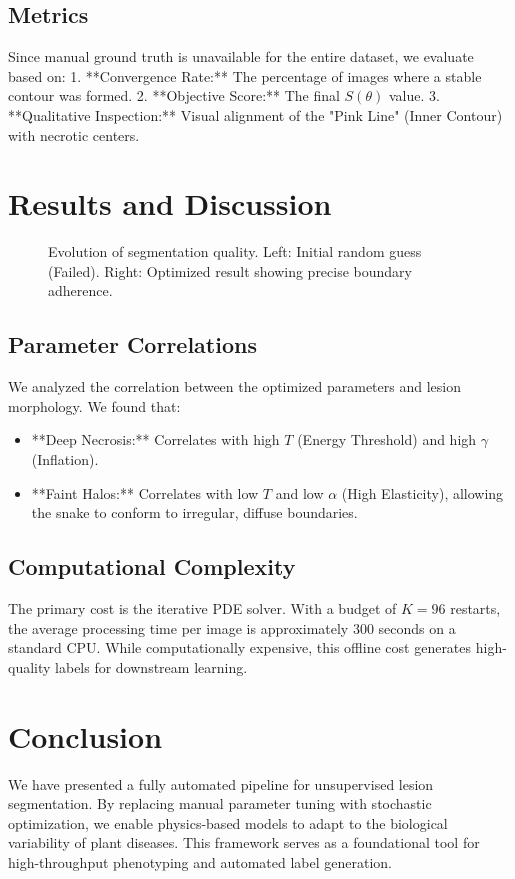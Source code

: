 \documentclass[journal]{IEEEtran}
\begin{document}
\subsection{Metrics}
Since manual ground truth is unavailable for the entire dataset, we evaluate based on:
1. **Convergence Rate:** The percentage of images where a stable contour was formed.
2. **Objective Score:** The final $S(\theta)$ value.
3. **Qualitative Inspection:** Visual alignment of the "Pink Line" (Inner Contour) with necrotic centers.

\section{Results and Discussion}

\begin{figure}[htbp]
\centerline{}
\caption{Evolution of segmentation quality. Left: Initial random guess (Failed). Right: Optimized result showing precise boundary adherence.}
\label{fig1}
\end{figure}

\subsection{Parameter Correlations}
We analyzed the correlation between the optimized parameters and lesion morphology. We found that:
\begin{itemize}
    \item **Deep Necrosis:** Correlates with high $T$ (Energy Threshold) and high $\gamma$ (Inflation).
    \item **Faint Halos:** Correlates with low $T$ and low $\alpha$ (High Elasticity), allowing the snake to conform to irregular, diffuse boundaries.
\end{itemize}

\subsection{Computational Complexity}
The primary cost is the iterative PDE solver. With a budget of $K=96$ restarts, the average processing time per image is approximately 300 seconds on a standard CPU. While computationally expensive, this offline cost generates high-quality labels for downstream learning.

\section{Conclusion}
We have presented a fully automated pipeline for unsupervised lesion segmentation. By replacing manual parameter tuning with stochastic optimization, we enable physics-based models to adapt to the biological variability of plant diseases. This framework serves as a foundational tool for high-throughput phenotyping and automated label generation.



\end{document}
